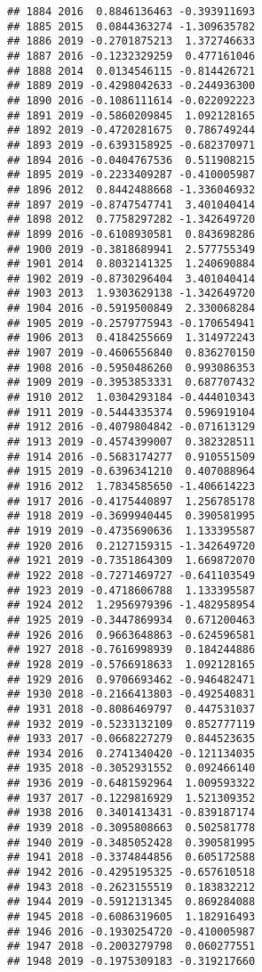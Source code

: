 \documentclass[
]{article}
\begin{document}
\begin{verbatim}
## 1884 2016  0.8846136463 -0.393911693
## 1885 2015  0.0844363274 -1.309635782
## 1886 2019 -0.2701875213  1.372746633
## 1887 2016 -0.1232329259  0.477161046
## 1888 2014  0.0134546115 -0.814426721
## 1889 2019 -0.4298042633 -0.244936300
## 1890 2016 -0.1086111614 -0.022092223
## 1891 2019 -0.5860209845  1.092128165
## 1892 2019 -0.4720281675  0.786749244
## 1893 2019 -0.6393158925 -0.682370971
## 1894 2016 -0.0404767536  0.511908215
## 1895 2019 -0.2233409287 -0.410005987
## 1896 2012  0.8442488668 -1.336046932
## 1897 2019 -0.8747547741  3.401040414
## 1898 2012  0.7758297282 -1.342649720
## 1899 2016 -0.6108930581  0.843698286
## 1900 2019 -0.3818689941  2.577755349
## 1901 2014  0.8032141325  1.240690884
## 1902 2019 -0.8730296404  3.401040414
## 1903 2013  1.9303629138 -1.342649720
## 1904 2016 -0.5919500849  2.330068284
## 1905 2019 -0.2579775943 -0.170654941
## 1906 2013  0.4184255669  1.314972243
## 1907 2019 -0.4606556840  0.836270150
## 1908 2016 -0.5950486260  0.993086353
## 1909 2019 -0.3953853331  0.687707432
## 1910 2012  1.0304293184 -0.444010343
## 1911 2019 -0.5444335374  0.596919104
## 1912 2016 -0.4079804842 -0.071613129
## 1913 2019 -0.4574399007  0.382328511
## 1914 2016 -0.5683174277  0.910551509
## 1915 2019 -0.6396341210  0.407088964
## 1916 2012  1.7834585650 -1.406614223
## 1917 2016 -0.4175440897  1.256785178
## 1918 2019 -0.3699940445  0.390581995
## 1919 2019 -0.4735690636  1.133395587
## 1920 2016  0.2127159315 -1.342649720
## 1921 2019 -0.7351864309  1.669872070
## 1922 2018 -0.7271469727 -0.641103549
## 1923 2019 -0.4718606788  1.133395587
## 1924 2012  1.2956979396 -1.482958954
## 1925 2019 -0.3447869934  0.671200463
## 1926 2016  0.9663648863 -0.624596581
## 1927 2018 -0.7616998939  0.184244886
## 1928 2019 -0.5766918633  1.092128165
## 1929 2016  0.9706693462 -0.946482471
## 1930 2018 -0.2166413803 -0.492540831
## 1931 2018 -0.8086469797  0.447531037
## 1932 2019 -0.5233132109  0.852777119
## 1933 2017 -0.0668227279  0.844523635
## 1934 2016  0.2741340420 -0.121134035
## 1935 2018 -0.3052931552  0.092466140
## 1936 2019 -0.6481592964  1.009593322
## 1937 2017 -0.1229816929  1.521309352
## 1938 2016  0.3401413431 -0.839187174
## 1939 2018 -0.3095808663  0.502581778
## 1940 2019 -0.3485052428  0.390581995
## 1941 2018 -0.3374844856  0.605172588
## 1942 2016 -0.4295195325 -0.657610518
## 1943 2018 -0.2623155519  0.183832212
## 1944 2019 -0.5912131345  0.869284088
## 1945 2018 -0.6086319605  1.182916493
## 1946 2016 -0.1930254720 -0.410005987
## 1947 2018 -0.2003279798  0.060277551
## 1948 2019 -0.1975309183 -0.319217660

\end{verbatim}
\end{document}
